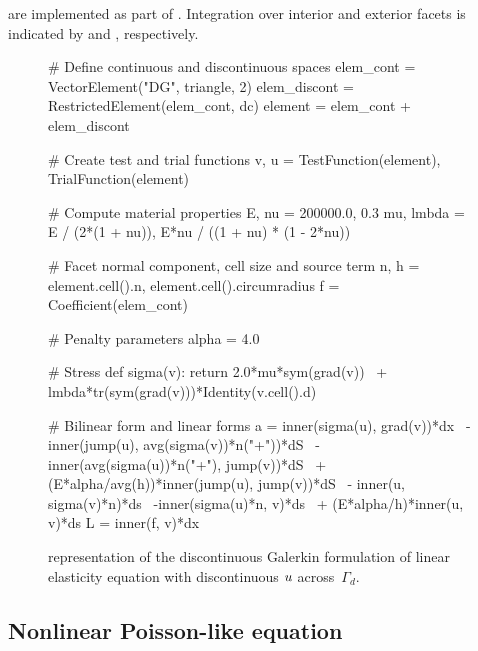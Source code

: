 are implemented as part of \ufl{}. Integration over interior and exterior
facets is indicated by  and , respectively.
%
\begin{figure}
\bwfig
\begin{python}
# Define continuous and discontinuous spaces
elem_cont    = VectorElement("DG", triangle, 2)
elem_discont = RestrictedElement(elem_cont, dc)
element      = elem_cont + elem_discont

# Create test and trial functions
v, u = TestFunction(element), TrialFunction(element)

# Compute material properties
E, nu     = 200000.0, 0.3
mu, lmbda = E / (2*(1 + nu)), E*nu / ((1 + nu) * (1 - 2*nu))

# Facet normal component, cell size and source term
n, h = element.cell().n, element.cell().circumradius
f = Coefficient(elem_cont)

# Penalty parameters
alpha = 4.0

# Stress
def sigma(v):
   return 2.0*mu*sym(grad(v)) \
  + lmbda*tr(sym(grad(v)))*Identity(v.cell().d)

# Bilinear form and linear forms
a = inner(sigma(u), grad(v))*dx \
  - inner(jump(u), avg(sigma(v))*n("+"))*dS \
  - inner(avg(sigma(u))*n("+"), jump(v))*dS \
  + (E*alpha/avg(h))*inner(jump(u), jump(v))*dS \
  - inner(u, sigma(v)*n)*ds \
  -inner(sigma(u)*n, v)*ds \
  + (E*alpha/h)*inner(u, v)*ds
L = inner(f, v)*dx
\end{python}
\caption{{\ufl} representation of the discontinuous Galerkin formulation of
linear elasticity equation with discontinuous $u$ across~$\Gamma_{d}$.}
\label{code:nikbakht:dg-elasticity}
\end{figure}

\subsection{Nonlinear Poisson-like equation}

